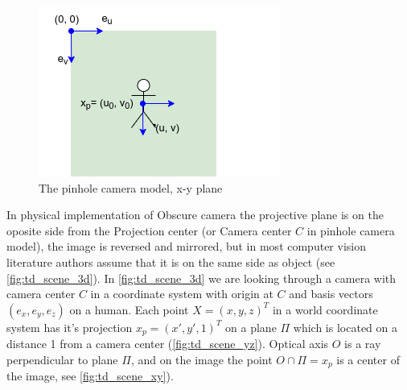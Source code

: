 \begin{figure}[h]
    \centering
    \includegraphics[width=.5\textwidth]{graphics/td_scene_xy.png}
    \caption{The pinhole camera model, x-y plane}
    \label{fig:td_scene_xy}
\end{figure}

In physical implementation of Obscure camera the projective plane is on the oposite side from the Projection center (or Camera center $C$ in pinhole camera model), the image is reversed and mirrored, but in most computer vision literature authors assume that it is on the same side as object (see \autoref{fig:td_scene_3d}).
In \autoref{fig:td_scene_3d} we are looking through a camera with camera center $C$ in a coordinate system with origin at $C$ and basis vectors $(e_x, e_y, e_z)$ on a human. 
Each point $X = (x, y, z)^T$ in a world coordinate system has it's projection $x_p = (x', y', 1)^T$ on a plane $\Pi$ which is located on a distance 1 from a camera center (\autoref{fig:td_scene_yz}). 
Optical axis $O$ is a ray perpendicular to plane $\Pi$, and on the image the point $ O \cap \Pi = x_p$ is a center of the image, see \autoref{fig:td_scene_xy}).

